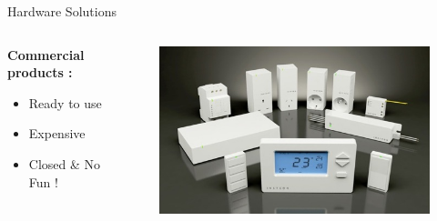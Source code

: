 \documentclass{beamer}
\begin{document}
\begin{frame}{Hardware Solutions}
\begin{columns}
\begin{column}[l]{0.5\textwidth}
\textbf{Commercial products :}
\begin{itemize}
\item[\Large\smiley] Ready to use
\item[\Large\frownie] Expensive
\item[\Large\frownie] Closed \& No Fun !

\end{itemize}
\end{column}
\begin{column}[r]{0.5\textwidth}
\begin{figure}
\includegraphics[width=\columnwidth]{figures/Home-Automation-Products.jpg}
\end{figure}
\end{column}
\end{columns}


\end{frame}
\end{document}

